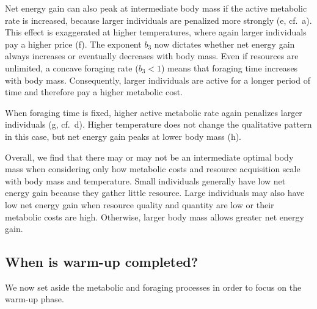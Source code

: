 Net energy gain can also peak at intermediate body mass if the active metabolic rate is increased, because larger individuals are penalized more strongly (e, cf.~a).
This effect is exaggerated at higher temperatures, where again larger individuals pay a higher price (f).
The exponent $b_3$ now dictates whether net energy gain always increases or eventually decreases with body mass.
Even if resources are unlimited, a concave foraging rate ($b_3 < 1$) means that foraging time increases with body mass.
Consequently, larger individuals are active for a longer period of time and therefore pay a higher metabolic cost.

When foraging time is fixed, higher active metabolic rate again penalizes larger individuals (g, cf.~d).
Higher temperature does not change the qualitative pattern in this case, but net energy gain peaks at lower body mass (h).

Overall, we find that there may or may not be an intermediate optimal body mass when considering only how metabolic costs and resource acquisition scale with body mass and temperature.
Small individuals generally have low net energy gain because they gather little resource. %
Large individuals may also have low net energy gain when resource quality and quantity are low or their metabolic costs are high.
Otherwise, larger body mass allows greater net energy gain.


\subsection*{When is warm-up completed?}

We now set aside the metabolic and foraging processes in order to focus on the warm-up phase.

